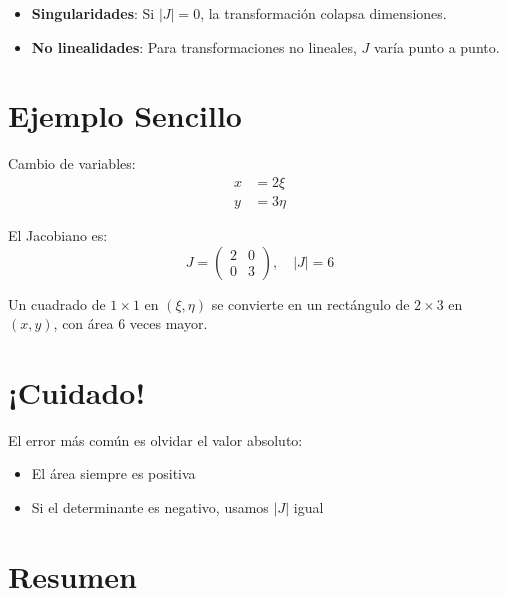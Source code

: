 \documentclass{article}
\begin{document}
\begin{minipage}{\dimexpr\textwidth-2\fboxsep}
\begin{itemize}
\item \textbf{Singularidades}: Si $|J| = 0$, la transformación colapsa dimensiones.
\item \textbf{No linealidades}: Para transformaciones no lineales, $J$ varía punto a punto.
\end{itemize}
\end{minipage}

\section{Ejemplo Sencillo}

Cambio de variables:
\begin{align*}
x &= 2\xi \\
y &= 3\eta
\end{align*}

El Jacobiano es:
\[
J = \begin{pmatrix}
2 & 0 \\
0 & 3
\end{pmatrix}, \quad |J| = 6
\]

Un cuadrado de $1 \times 1$ en $(\xi,\eta)$ se convierte en un rectángulo de $2 \times 3$ en $(x,y)$, con área 6 veces mayor.

\section{¡Cuidado!}

El error más común es olvidar el valor absoluto:
\begin{itemize}
\item El área siempre es positiva
\item Si el determinante es negativo, usamos $|J|$ igual
\end{itemize}

\section{Resumen}

\begin{center}
\end{center}
\end{document}
